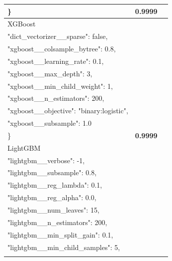 \documentclass[11pt,a4paper,spanish]{book}
\numberwithin{equation}{chapter}
\numberwithin{figure}{chapter}
\begin{document}
\begin{table}[h]
\begin{tabular}{|p{3.5cm}|p{9cm}|c|}
\begin{minipage}[t]{9cm}
{    \}}
    \end{minipage}
    & \textbf{0.9999} \\
    \hline
    XGBoost &
    \ttfamily
    \begin{minipage}[t]{9cm}
    {\{\\
    \hspace*{0.5cm}"dict\_vectorizer\_\_sparse": false,\\
    \hspace*{0.5cm}"xgboost\_\_colsample\_bytree": 0.8,\\
    \hspace*{0.5cm}"xgboost\_\_learning\_rate": 0.1,\\
    \hspace*{0.5cm}"xgboost\_\_max\_depth": 3,\\
    \hspace*{0.5cm}"xgboost\_\_min\_child\_weight": 1,\\
    \hspace*{0.5cm}"xgboost\_\_n\_estimators": 200,\\
    \hspace*{0.5cm}"xgboost\_\_objective": "binary:logistic",\\
    \hspace*{0.5cm}"xgboost\_\_subsample": 1.0\\
    \}}
    \end{minipage}
    & \textbf{0.9999} \\
    \hline
    LightGBM &
    \ttfamily
    \begin{minipage}[t]{9cm}
    {\{\\
    \hspace*{0.5cm}"lightgbm\_\_verbose": -1,\\
    \hspace*{0.5cm}"lightgbm\_\_subsample": 0.8,\\
    \hspace*{0.5cm}"lightgbm\_\_reg\_lambda": 0.1,\\
    \hspace*{0.5cm}"lightgbm\_\_reg\_alpha": 0.0,\\
    \hspace*{0.5cm}"lightgbm\_\_num\_leaves": 15,\\
    \hspace*{0.5cm}"lightgbm\_\_n\_estimators": 200,\\
    \hspace*{0.5cm}"lightgbm\_\_min\_split\_gain": 0.1,\\
    \hspace*{0.5cm}"lightgbm\_\_min\_child\_samples": 5,\\
}
\end{minipage}
\end{tabular}
\end{table}
\end{document}
